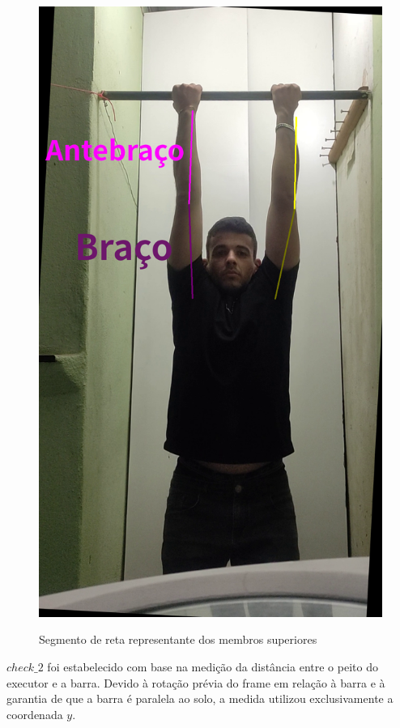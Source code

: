 \begin{figure}[H]
	\centering
    \caption{Segmento de reta representante dos membros superiores}
	\includegraphics[scale=0.2]{figuras/braco_esticado/82_braco_antebraco.png}
	\label{fig:braco_antebraco}
\end{figure}

$check\_2$ foi estabelecido com base na medição da distância entre o peito do executor e a barra. Devido à rotação prévia do frame em relação à barra e à garantia de que a barra é paralela ao solo, a medida utilizou exclusivamente a coordenada $y$.

